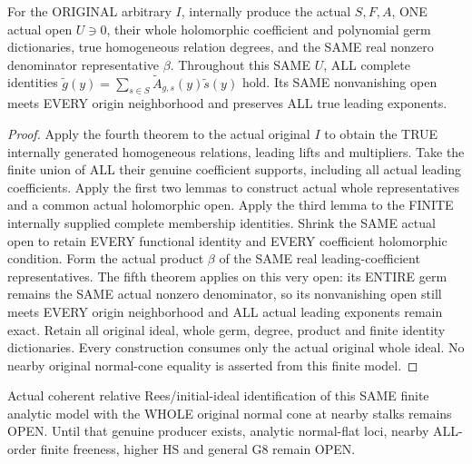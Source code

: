 \begin{theorem}
\label{hir:relative-normal-analytic-coefficients-original-consumer}
\leanok
{}
For the ORIGINAL arbitrary $I$, internally produce the actual $S,F,A$,
ONE actual open $U\ni0$, their whole holomorphic coefficient and polynomial
germ dictionaries, true homogeneous relation degrees, and the SAME real
nonzero denominator representative $\beta$. Throughout this SAME $U$,
ALL complete identities $\widetilde g(y)=\sum_{s\in S}
\widetilde A_{g,s}(y)\widetilde s(y)$ hold. Its SAME nonvanishing open
meets EVERY origin neighborhood and preserves ALL true leading exponents.
\end{theorem}
\begin{proof}
Apply the fourth theorem to the actual original $I$ to obtain the TRUE
internally generated homogeneous relations, leading lifts and multipliers.
Take the finite union of ALL their genuine coefficient supports, including
all actual leading coefficients. Apply the first two lemmas to construct
actual whole representatives and a common actual holomorphic open.
Apply the third lemma to the FINITE internally supplied complete membership
identities. Shrink the SAME actual open to retain EVERY functional identity
and EVERY coefficient holomorphic condition. Form the actual product
$\beta$ of the SAME real leading-coefficient representatives. The fifth
theorem applies on this very open: its ENTIRE germ remains the SAME actual
nonzero denominator, so its nonvanishing open still meets EVERY origin
neighborhood and ALL actual leading exponents remain exact. Retain all
original ideal, whole germ, degree, product and finite identity dictionaries.
Every construction consumes only the actual original whole ideal.
No nearby original normal-cone equality is asserted from this finite model.
\end{proof}

\begin{remark}
Actual coherent relative Rees/initial-ideal identification of this SAME
finite analytic model with the WHOLE original normal cone at nearby stalks
remains OPEN. Until that genuine producer exists, analytic normal-flat loci,
nearby ALL-order finite freeness, higher HS and general G8 remain OPEN.
\end{remark}
